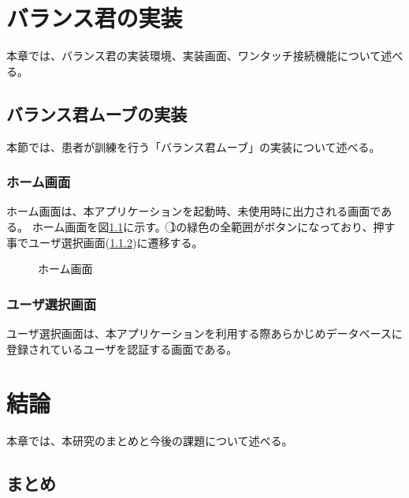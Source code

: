 \documentclass[a4j,12pt,onecolumn,oneside,titlepage,openany,final]{jreport}
\begin{document}

\chapter{バランス君の実装}\label{chap:jisso}
本章では、バランス君の実装環境、実装画面、ワンタッチ接続機能について述べる。

\section{バランス君ムーブの実装}\label{sec:rihabiri_jisso}
本節では、患者が訓練を行う「バランス君ムーブ」の実装について述べる。

\subsection{ホーム画面}\label{sec:home}
ホーム画面は、本アプリケーションを起動時、未使用時に出力される画面である。
ホーム画面を図\ref{fig:p_home}に示す。
\textcircled{\scriptsize 1}の緑色の全範囲がボタンになっており、押す事でユーザ選択画面(\ref{sec:all})に遷移する。
	
\begin{figure}[htbp]
  \centering %
  \fbox{
%
%
%
  }
  \caption{ホーム画面}\label{fig:p_home}
\end{figure}

\subsection{ユーザ選択画面}\label{sec:all}
ユーザ選択画面は、本アプリケーションを利用する際あらかじめデータベースに登録されているユーザを認証する画面である。


\chapter{結論}\label{chap:keturon}
本章では、本研究のまとめと今後の課題について述べる。

\section{まとめ}\label{sec:matome}
 
\end{document}
